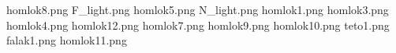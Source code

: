 homlok8.png
F_light.png
homlok5.png
N_light.png
homlok1.png
homlok3.png
homlok4.png
homlok12.png
homlok7.png
homlok9.png
homlok10.png
teto1.png
falak1.png
homlok11.png
